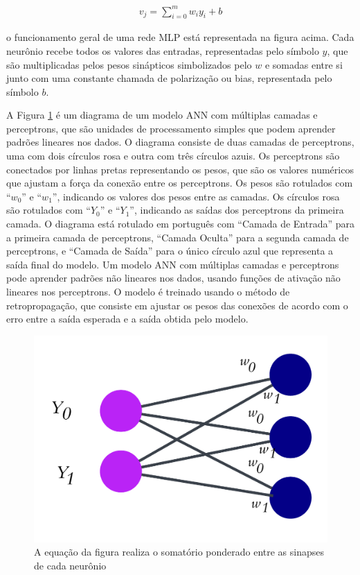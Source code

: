 \begin{eqnarray}
	v_j=\sum_{i=0}^m w_i y_i+b\label{eq:ann}
\end{eqnarray}

\noindent o funcionamento geral de uma rede MLP está representada na figura acima. Cada neurônio recebe todos os valores das entradas, representadas pelo símbolo $y$, que são multiplicadas pelos pesos sinápticos simbolizados pelo $w$ e somadas entre si junto com uma constante chamada de polarização ou bias, representada pelo símbolo $b$.

A Figura \ref{fig:ann1} é um diagrama de um modelo ANN com múltiplas camadas e perceptrons, que são unidades de processamento simples que podem aprender padrões lineares nos dados.
O diagrama consiste de duas camadas de perceptrons, uma com dois círculos rosa e outra com três círculos azuis. Os perceptrons são conectados por linhas pretas representando os pesos, que são os valores numéricos que ajustam a força da conexão entre os perceptrons.
Os pesos são rotulados com ``$w_0$'' e ``$w_1$'', indicando os valores dos pesos entre as camadas. Os círculos rosa são rotulados com ``$Y_0$'' e ``$Y_1$'', indicando as saídas dos perceptrons da primeira camada.
O diagrama está rotulado em português com ``Camada de Entrada'' para a primeira camada de perceptrons, ``Camada Oculta'' para a segunda camada de perceptrons, e ``Camada de Saída'' para o único círculo azul que representa a saída final do modelo.
Um modelo ANN com múltiplas camadas e perceptrons pode aprender padrões não lineares nos dados, usando funções de ativação não lineares nos perceptrons. O modelo é treinado usando o método de retropropagação, que consiste em ajustar os pesos das conexões de acordo com o erro entre a saída esperada e a saída obtida pelo modelo.

\begin{figure}[H]
	\centering
	\caption{A equação da figura realiza o somatório ponderado entre as sinapses de cada neurônio}
	\includegraphics[width=0.5\linewidth]{Apendices/Figuras/modelagem-24h/ann1}
	
	\label{fig:ann1}
	
\end{figure}




